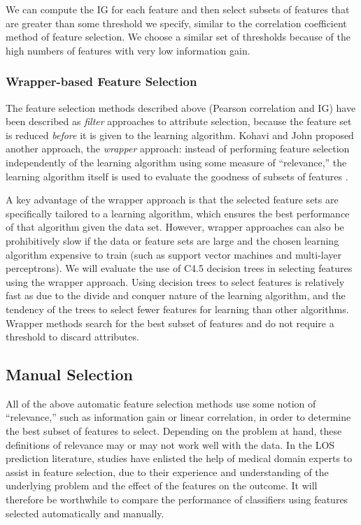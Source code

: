 \documentclass{article}
\begin{document}
We can compute the IG for each feature and then select subsets of features that
are greater than some threshold we specify, similar to the correlation
coefficient method of feature selection. We choose a similar set of thresholds
because of the high numbers of features with very low information gain.

\subsubsection{Wrapper-based Feature Selection}
The feature selection methods described above (Pearson correlation and IG) have
been described as \textit{filter} approaches to
attribute selection, because the feature set is reduced \textit{before} it
is given to the learning algorithm.
Kohavi and John proposed another approach, the \textit{wrapper} approach:
instead of performing feature selection independently of the learning
algorithm using some measure of ``relevance,''
the learning algorithm itself is used to evaluate the goodness of
subsets of features \cite{Kohavi1997}. 

A key advantage of the wrapper approach is that the selected feature sets are
specifically tailored to a learning algorithm, which ensures the best
performance of that algorithm given the data set. However, wrapper approaches
can also be prohibitively slow if the data or feature sets are large and the
chosen learning algorithm expensive to train (such as support vector machines
and multi-layer perceptrons). We will evaluate the use of C4.5 decision trees
in selecting features using the wrapper approach.
Using decision trees to select features is relatively fast as due to the
divide and conquer nature of the learning algorithm, and the tendency of the
trees to select fewer features for learning than other algorithms.
Wrapper methods search for the best subset of features and do not require a
threshold to discard attributes.

\subsection{Manual Selection}
All of the above automatic feature selection methods use some notion of
``relevance,'' such as information gain or linear correlation,
in order to determine the best subset of features to select.
Depending on the problem at hand, these definitions of relevance may or may
not work well with the data. In the LOS prediction literature, studies
have enlisted the help of medical domain experts to assist in feature
selection, due to their experience and understanding of the underlying
problem and the effect of the features on the outcome. It will therefore be
worthwhile to compare the performance of classifiers using features selected
automatically and manually.
\end{document}
